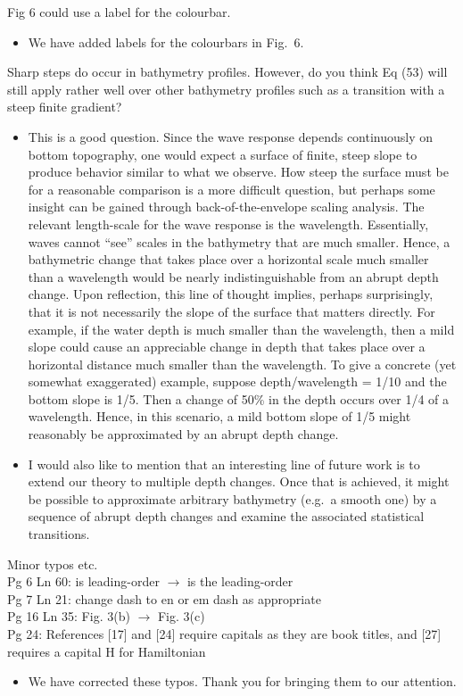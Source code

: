 \documentclass[11pt]{article}
\newcommand{\comment}[1]{{\color{blue} #1}}
\begin{document}
\noindent
\comment{Fig 6 could use a label for the colourbar.}

\begin{itemize}
\item We have added  labels for the colourbars in Fig.~6.
\end{itemize}

\noindent
\comment{Sharp steps do occur in bathymetry profiles. However, do you think Eq (53) will still apply rather well over other bathymetry profiles such as a transition with a steep finite gradient?}
\begin{itemize}
\item This is a good question. Since the wave response depends continuously on bottom topography, one would expect a surface of finite, steep slope to produce behavior similar to what we observe. How steep the surface must be for a reasonable comparison is a more difficult question, but perhaps some insight can be gained through back-of-the-envelope scaling analysis. The relevant length-scale for the wave response is the wavelength. Essentially, waves cannot ``see'' scales in the bathymetry that are much smaller. Hence, a bathymetric change that takes place over a horizontal scale much smaller than a wavelength would be nearly indistinguishable from an abrupt depth change. Upon reflection, this line of thought implies, perhaps surprisingly, that it is not necessarily the slope of the surface that matters directly. For example, if the water depth is much smaller than the wavelength, then a mild slope could cause an appreciable change in depth that takes place over a horizontal distance much smaller than the wavelength. To give a concrete (yet somewhat exaggerated) example, suppose depth/wavelength = 1/10 and the bottom slope is 1/5. Then a change of 50\% in the depth occurs over 1/4 of a wavelength. Hence, in this scenario, a mild bottom slope of 1/5 might reasonably be approximated by an abrupt depth change.
\item I would also like to mention that an interesting line of future work is to extend our theory to multiple depth changes. Once that is achieved, it might be possible to approximate arbitrary bathymetry (e.g.~a smooth one) by a sequence of abrupt depth changes and examine the associated statistical transitions.
\end{itemize}

\noindent
\comment{Minor typos etc.
\\Pg 6 Ln 60: is leading-order $\to$ is the leading-order %
\\Pg 7 Ln 21: change dash to en or em dash as appropriate %
\\Pg 16 Ln 35: Fig. 3(b) $\to$ Fig. 3(c)%
\\Pg 24: References [17] and [24] require capitals as they are book titles, and [27] requires a capital H for Hamiltonian %
}
\begin{itemize}
\item We have corrected these typos. Thank you for bringing them to our attention.
\end{itemize}
\end{document}
